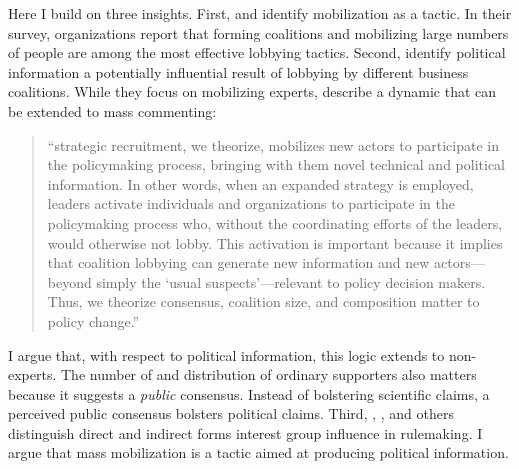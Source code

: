 Here I build on three insights. First, \citet{Kerwin2011} and \citet{Furlong1997} identify mobilization as a tactic. In their survey, organizations report that forming coalitions and mobilizing large numbers of people are among the most effective lobbying tactics. Second, \citet{Nelson2012} identify political information a potentially influential result of lobbying by different business coalitions. While they focus on mobilizing experts, \citet{Nelson2012} describe a dynamic that can be extended to mass commenting: 
\begin{quote}
``strategic recruitment, we theorize, mobilizes new actors to participate in the policymaking process, bringing with them novel technical and political information. In other words, when an expanded strategy is employed, leaders activate individuals and organizations to participate in the policymaking process who, without the coordinating efforts of the leaders, would otherwise not lobby. This activation is important because it implies that coalition lobbying can generate new information and new actors---beyond simply the `usual suspects'---relevant to policy decision makers. Thus, we theorize consensus, coalition size, and composition matter to policy change.'' 
\end{quote}
I argue that, with respect to political information, this logic extends to non-experts. The number of and distribution of ordinary supporters also matters because it suggests a \textit{public} consensus. Instead of bolstering scientific claims, a perceived public consensus bolsters political claims. 
Third, \citet{Furlong1998}, \citet{Yackee2006JPART}, and others distinguish direct and indirect forms interest group influence in rulemaking. I argue that mass mobilization is a tactic aimed at producing political information.%


